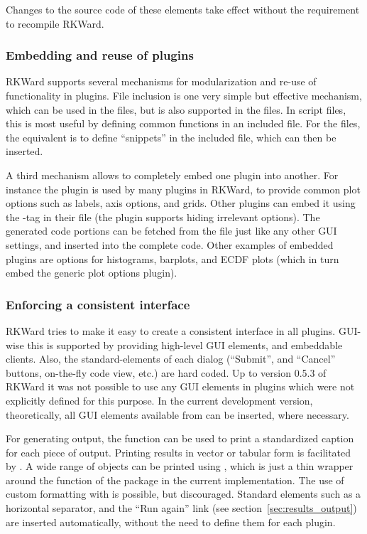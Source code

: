Changes to the source code of these elements take effect without the requirement to recompile RKWard.

\subsubsection{Embedding and reuse of plugins}
\label{sec:technical_plugins_embedding}
RKWard supports several mechanisms for modularization and re-use of
functionality in plugins. File inclusion is one very simple but effective
mechanism, which can be used in the  files, but is also supported in
the  files. In script files, this is most useful by defining common functions
in an included file. For the  files, the equivalent is to define ``snippets''
in the included file, which can then be inserted.

A third mechanism allows to completely embed one plugin into another. For
instance the  plugin is used by many plugins in RKWard, to provide
common plot options such as labels, axis options, and grids. Other plugins
can embed it using the -tag in their  file (the plugin supports
hiding irrelevant options). The generated code portions can be fetched from the
 file just like any other GUI settings, and inserted into the complete
code. Other examples of embedded plugins are options for histograms, barplots,
and ECDF plots (which in turn embed the generic plot options plugin).

\subsubsection{Enforcing a consistent interface}
\label{sec:technical_plugins_consistency}
RKWard tries to make it easy to create a consistent interface in all plugins.
GUI-wise this is supported by providing high-level GUI elements, and embeddable
clients. Also, the standard-elements of each dialog (``Submit'', and
``Cancel'' buttons, on-the-fly code view, etc.) are hard coded. Up to version
0.5.3 of RKWard it was not possible to use any GUI elements in plugins which
were not explicitly defined for this purpose. In the current development
version, theoretically, all GUI elements available from  can be inserted,
where necessary.

For generating output, the function  can be used to print a
standardized caption for each piece of output. Printing results in vector or
tabular form is facilitated by . A wide range of objects can be
printed using , which is just a thin wrapper around the
 function of the  package \citep{Lecoutre2003} in the current
implementation. The use of custom formatting with  is possible, but
discouraged. Standard elements such as a horizontal separator, and the ``Run again''
link (see section~\ref{sec:results_output}) are inserted automatically, without the need to define
them for each plugin.

